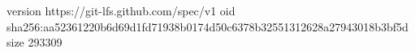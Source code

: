 version https://git-lfs.github.com/spec/v1
oid sha256:aa52361220b6d69d1fd71938b0174d50c6378b32551312628a27943018b3bf5d
size 293309
